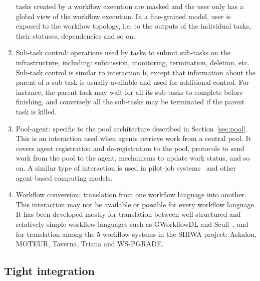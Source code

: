 \documentclass[preprint,3p,twocolumn]{elsarticle}
\begin{document}
\begin{enumerate}[leftmargin=0cm,itemindent=0.65cm,label=\texttt{(\alph*)}]
  tasks created by a workflow execution are masked and the user only
  has a global view of the workflow execution. In a fine-grained
  model, user is exposed to the workflow topology, i.e. to the outputs
  of the individual tasks, their statuses, dependencies and so on.
\item Sub-task control: operations used by tasks to submit sub-tasks
  on the infrastructure, including: submission, monitoring,
  termination, deletion, etc. Sub-task control is similar to
  interaction \texttt{b}, except that information about the parent
  of a sub-task is usually available and used for
  additional control. For instance, the parent task may wait for all
  its sub-tasks to complete before finishing, and conversely all the
  sub-tasks may be terminated if the parent task is killed.
\item Pool-agent: specific to the pool architecture described in
  Section~\ref{sec:pool}. This is an interaction used when agents
  retrieve work from a central pool. It covers agent registration and
  de-registration to the pool, protocols to send work from the pool to
  the agent, mechanisms to update work status, and so on. A similar
  type of interaction is used in pilot-job
  systems~\cite{turilli2015comprehensive} and other agent-based
  computing models.
\item Workflow conversion: translation from one workflow language into
  another. This interaction may not be available or possible for every
  workflow language. It has been developed mostly for translation
  between well-structured and relatively simple workflow languages
  such as GWorkflowDL and Scufl~\cite{OLAB-09}, and for translation
  among the 5 workflow systems in the SHIWA project: Askalon, MOTEUR,
  Taverna, Triana and WS-PGRADE.  
\end{enumerate}


\subsection{Tight integration}
\end{document}
